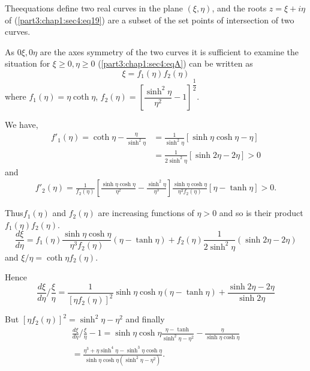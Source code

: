The\pageoriginale equations define two real curves in the plane $(\xi,
\eta)$, and 
the roots $z= \xi + i \eta$ of (\ref{part3:chap1:sec4:eq19}) are a
subset of the set points of intersection of two curves. 

As $0 \xi,  0 \eta$ are the axes symmetry of the two curves it is
sufficient to examine the situation for $\xi \geq 0, \eta \geq 0$
(\ref{part3:chap1:sec4:eqA}) 
can be written as 
\begin{equation*}
  \xi = f_1 (\eta) f_2 (\eta) \tag{B$'$}\label{part3:chap1:sec4:eqB'}
\end{equation*}
where $f_1(\eta) = \eta \coth \eta$,  $f_2 (\eta)= \left [
  \dfrac{\sinh^2 \eta}{\eta^2}-1 \right ]^{\dfrac{1}{2}}$. 

We have,
\begin{align*}
  f'_1(\eta) = \coth \eta - \frac{\eta}{\sinh^2 \eta} & = \frac{1}{\sinh^2
    \eta} \left[ \sinh \eta \cosh \eta - \eta \right] \\ 
  & = \frac{1}{ 2\sinh^2 \eta} \left[ \sinh 2\eta - 2 \eta  \right] > 0
\end{align*}
and
\begin{gather*}
  f'_2(\eta) = \frac{1}{f_2 (\eta)} \left[ \frac{\sinh \eta \cosh
      \eta}{\eta^2} -\frac{\sinh^2 \eta}{\eta^3} \right] 
  \frac{\sinh \eta \cosh \eta}{\eta^3 f_2 (\eta)} \left[ \eta - \tanh
    \eta \right] > 0. 
\end{gather*}
 
Thus\pageoriginale $f_1 (\eta)$ and $f_2 (\eta)$ are increasing functions of $\eta >
0$ and so is their product $f_1(\eta) f_2 (\eta)$. 
 $$
 \frac{d \xi}{d \eta}= f_1(\eta) \frac{\sinh \eta \cosh \eta}{\eta^3
   f_2 (\eta)} (\eta- \tanh \eta) + f_2 (\eta) \frac{1}{2 \sinh^2
   \eta}(\sinh 2 \eta - 2 \eta )  
 $$
 and $\xi/\eta = \coth \eta f_2 (\eta)$.
 
 Hence
 $$
 \frac{d \xi}{d \eta} / \frac{\xi}{\eta}=\frac{1}{[\eta f_2 (\eta)]^2}
 \sinh \eta \cosh \eta (\eta - \tanh \eta) + \frac{\sinh 2 \eta - 2
   \eta}{\sinh 2 \eta} 
 $$

 But $\left [ \eta f_2 (\eta)\right]^2 = \sinh^2 \eta - \eta^2$ and finally
 \begin{gather*}
   \frac{d \xi}{d \eta}/ \frac{\xi}{\eta}-1 = \sinh \eta \cosh \eta
   \frac{\eta - \tanh}{\sinh^2 \eta - \eta^2} - \frac{\eta}{\sinh \eta
     \cosh \eta} \\ 
   = \frac{\eta^3 + \eta \sinh ^4 \eta - \sinh^3 \eta \cosh
     \eta}{\sinh \eta \cosh \eta (\sinh^2 \eta - \eta^2)}. 
 \end{gather*} 
 

